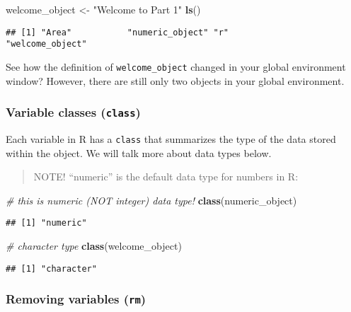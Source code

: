 \documentclass[]{article}
\newenvironment{Shaded}{\begin{snugshade}}{\end{snugshade}}
\newcommand{\KeywordTok}[1]{\textcolor[rgb]{0.13,0.29,0.53}{\textbf{#1}}}
\newcommand{\StringTok}[1]{\textcolor[rgb]{0.31,0.60,0.02}{#1}}
\newcommand{\CommentTok}[1]{\textcolor[rgb]{0.56,0.35,0.01}{\textit{#1}}}
\newcommand{\NormalTok}[1]{#1}
\begin{document}
\begin{Shaded}
\begin{Highlighting}[]
\NormalTok{welcome_object <-}\StringTok{ "Welcome to Part 1"}
\KeywordTok{ls}\NormalTok{() }
\end{Highlighting}
\end{Shaded}

\begin{verbatim}
## [1] "Area"           "numeric_object" "r"              "welcome_object"
\end{verbatim}

See how the definition of \texttt{welcome\_object} changed in your
global environment window? However, there are still only two objects in
your global environment.

\subsubsection{\texorpdfstring{Variable classes
(\texttt{class})}{Variable classes (class)}}\label{variable-classes-class}

Each variable in R has a \texttt{class} that summarizes the type of the
data stored within the object. We will talk more about data types below.

\begin{quote}
NOTE! ``numeric'' is the default data type for numbers in R:
\end{quote}

\begin{Shaded}
\begin{Highlighting}[]
\CommentTok{# this is numeric (NOT integer) data type!}
\KeywordTok{class}\NormalTok{(numeric_object) }
\end{Highlighting}
\end{Shaded}

\begin{verbatim}
## [1] "numeric"
\end{verbatim}

\begin{Shaded}
\begin{Highlighting}[]
\CommentTok{# character type}
\KeywordTok{class}\NormalTok{(welcome_object) }
\end{Highlighting}
\end{Shaded}

\begin{verbatim}
## [1] "character"
\end{verbatim}

\subsubsection{\texorpdfstring{Removing variables
(\texttt{rm})}{Removing variables (rm)}}\label{removing-variables-rm}
\end{document}
